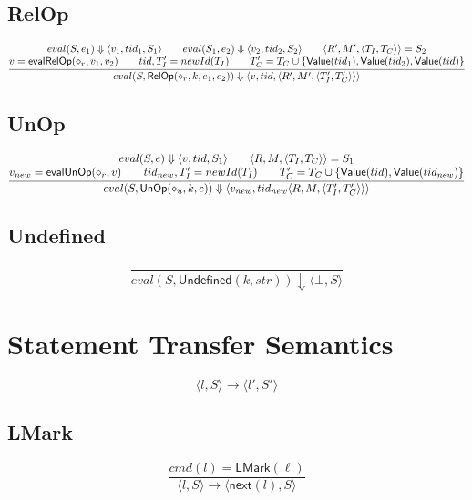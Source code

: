 \documentclass{article}
\newcommand{\step}[4]{\langle #1,#2\rangle \rightarrow \langle #3,#4\rangle}
\newcommand{\nexti}{\mathsf{next}}
\newcommand{\eval}[3]{eval(#1,#2) \Downarrow #3}
\begin{document}
\subsection{RelOp}
\[
\frac{
\begin{array}{@{}c@{}}
    \eval{S}{e_1}{\langle v_1,tid_1,S_1\rangle}\qquad
    \eval{S_1}{e_2}{\langle v_2,tid_2,S_2\rangle}\qquad
    \langle R', M', \langle T_I, T_C \rangle \rangle = S_2\\

    v=\mathsf{evalRelOp}(\diamond_r,v_1,v_2)\qquad
    tid, T_I'=newId(T_I)\qquad

    T_C'=T_C \cup \{\mathsf{Value}(tid_1), \mathsf{Value}(tid_2), \mathsf{Value}(tid)\}\\
\end{array}
}
{
    \eval{S}{\mathsf{RelOp}(\diamond_r,k,e_1,e_2)}
    {\langle v,tid,\langle R', M', \langle T_I',T_C'\rangle\rangle\rangle}
}
\]

\subsection{UnOp}
\[
\frac{
\begin{array}{@{}c@{}}
    \eval{S}{e}{\langle v,tid,S_1\rangle}\qquad
    \langle R, M, \langle T_I, T_C \rangle \rangle = S_1\\

    v_{new}=\mathsf{evalUnOp}(\diamond_r,v)\qquad
    tid_{new}, T_I'=newId(T_I)\qquad

    T_C'=T_C \cup \{\mathsf{Value}(tid), \mathsf{Value}(tid_{new})\}
\end{array}
}{
    \eval{S}{\mathsf{UnOp}(\diamond_u,k,e)}
    {\langle v_{new},tid_{new}\langle R,M,\langle T_I',T_C'\rangle\rangle\rangle}
}
\]

\subsection{Undefined}
\[
\frac{}{
    \eval{S}{\mathsf{Undefined}(k,str)}
    {\langle \bot,S \rangle}
}
\]

\newpage

\section{Statement Transfer Semantics}

\[ \step{l}{S}{l'}{S'} \]

\subsection{LMark}
\[
\frac{cmd(l)=\mathsf{LMark}(\ell)}
{ \step{l}{S}{\nexti(l)}{S} }
\]
\end{document}
